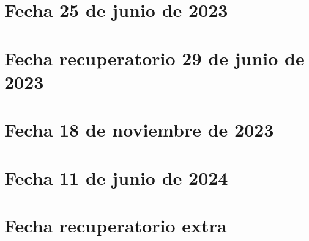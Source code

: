 \documentclass[10pt, a4paper]{report}
\begin{document}
        \section{Fecha 25 de junio de 2023}
            



        \newpage
        \section{Fecha recuperatorio 29 de junio de 2023}
            



        \newpage
        \section{Fecha 18 de noviembre de 2023}
            



        \newpage
        \section{Fecha 11 de junio de 2024}
            
     
    
          
           
            
          
                  \newpage
        \section{Fecha recuperatorio extra}
            
    
 
\end{document}
